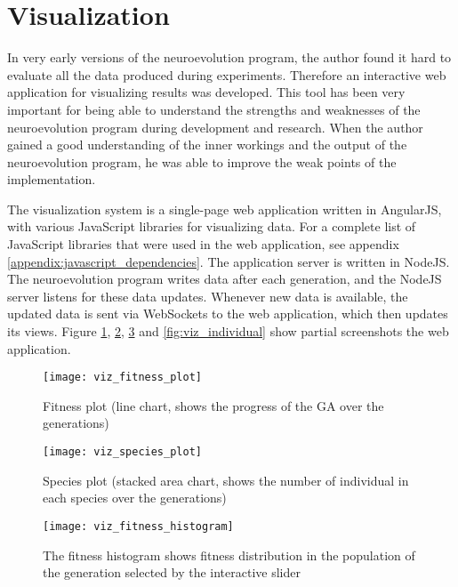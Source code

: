 \section{Visualization}
In very early versions of the neuroevolution program, the author found it hard to evaluate all the data produced during experiments. Therefore an interactive web application for visualizing results was developed. This tool has been very important for being able to understand the strengths and weaknesses of the neuroevolution program during development and research. When the author gained a good understanding of the inner workings and the output of the neuroevolution program, he was able to improve the weak points of the implementation.

The visualization system is a single-page web application written in AngularJS, with various JavaScript libraries for visualizing data. For a complete list of JavaScript libraries that were used in the web application, see appendix \ref{appendix:javascript_dependencies}. The application server is written in NodeJS. The neuroevolution program writes data after each generation, and the NodeJS server listens for these data updates. Whenever new data is available, the updated data is sent via WebSockets to the web application, which then updates its views. Figure \ref{fig:viz_fitness_plot}, \ref{fig:viz_species_plot}, \ref{fig:viz_fitness_histogram} and \ref{fig:viz_individual} show partial screenshots the web application.

\begin{figure}[h]
    \centering
    \texttt{[image: viz\_fitness\_plot]}
    \caption{Fitness plot (line chart, shows the progress of the GA over the generations)}
    \label{fig:viz_fitness_plot}
\end{figure}

\begin{figure}[h]
    \centering
    \texttt{[image: viz\_species\_plot]}
    \caption{Species plot (stacked area chart, shows the number of individual in each species over the generations)}
    \label{fig:viz_species_plot}
\end{figure}


\begin{figure}[h]
    \centering
    \texttt{[image: viz\_fitness\_histogram]}
    \caption{The fitness histogram shows fitness distribution in the population of the generation selected by the interactive slider}
    \label{fig:viz_fitness_histogram}
\end{figure}

